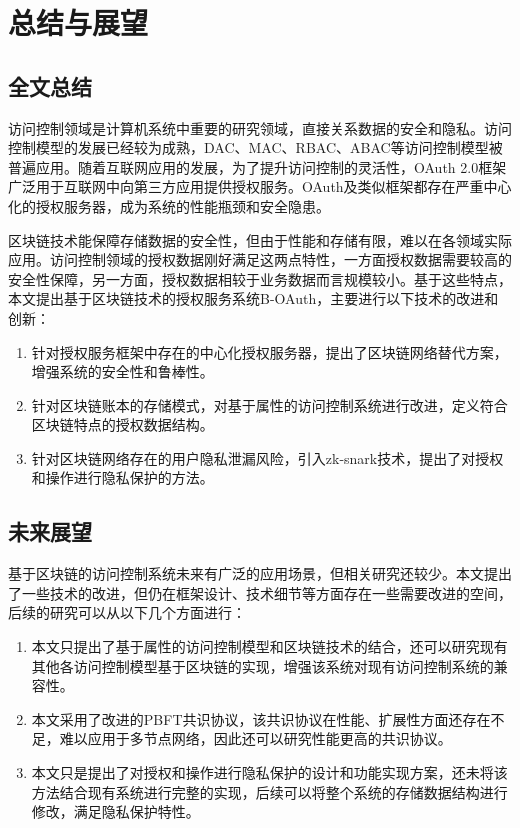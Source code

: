 
\chapter{总结与展望}

\section{全文总结}

访问控制领域是计算机系统中重要的研究领域，直接关系数据的安全和隐私。访问控制模型的发展已经较为成熟，DAC、MAC、RBAC、ABAC等访问控制模型被普遍应用。随着互联网应用的发展，为了提升访问控制的灵活性，OAuth 2.0框架广泛用于互联网中向第三方应用提供授权服务。OAuth及类似框架都存在严重中心化的授权服务器，成为系统的性能瓶颈和安全隐患。

区块链技术能保障存储数据的安全性，但由于性能和存储有限，难以在各领域实际应用。访问控制领域的授权数据刚好满足这两点特性，一方面授权数据需要较高的安全性保障，另一方面，授权数据相较于业务数据而言规模较小。基于这些特点，本文提出基于区块链技术的授权服务系统B-OAuth，主要进行以下技术的改进和创新：

\begin{enumerate}
	\item 针对授权服务框架中存在的中心化授权服务器，提出了区块链网络替代方案，增强系统的安全性和鲁棒性。
	\item 针对区块链账本的存储模式，对基于属性的访问控制系统进行改进，定义符合区块链特点的授权数据结构。
	\item 针对区块链网络存在的用户隐私泄漏风险，引入zk-snark技术，提出了对授权和操作进行隐私保护的方法。
\end{enumerate}

\section{未来展望}

基于区块链的访问控制系统未来有广泛的应用场景，但相关研究还较少。本文提出了一些技术的改进，但仍在框架设计、技术细节等方面存在一些需要改进的空间，后续的研究可以从以下几个方面进行：

\begin{enumerate}
	\item 本文只提出了基于属性的访问控制模型和区块链技术的结合，还可以研究现有其他各访问控制模型基于区块链的实现，增强该系统对现有访问控制系统的兼容性。
	\item 本文采用了改进的PBFT共识协议，该共识协议在性能、扩展性方面还存在不足，难以应用于多节点网络，因此还可以研究性能更高的共识协议。
	\item 本文只是提出了对授权和操作进行隐私保护的设计和功能实现方案，还未将该方法结合现有系统进行完整的实现，后续可以将整个系统的存储数据结构进行修改，满足隐私保护特性。
\end{enumerate}